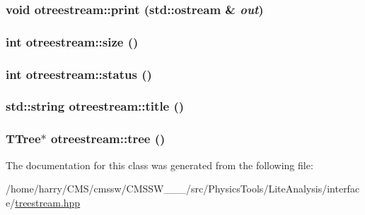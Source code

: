 \hypertarget{classotreestream_a22}{
\subsubsection[print]{\setlength{\rightskip}{0pt plus 5cm}void otreestream::print (std::ostream \& {\em out})}}
\label{classotreestream_a22}


\hypertarget{classotreestream_a18}{
\subsubsection[size]{\setlength{\rightskip}{0pt plus 5cm}int otreestream::size ()}}
\label{classotreestream_a18}


\hypertarget{classotreestream_a4}{
\subsubsection[status]{\setlength{\rightskip}{0pt plus 5cm}int otreestream::status ()}}
\label{classotreestream_a4}


\hypertarget{classotreestream_a20}{
\subsubsection[title]{\setlength{\rightskip}{0pt plus 5cm}std::string otreestream::title ()}}
\label{classotreestream_a20}


\hypertarget{classotreestream_a25}{
\subsubsection[tree]{\setlength{\rightskip}{0pt plus 5cm}TTree$\ast$ otreestream::tree ()}}
\label{classotreestream_a25}




The documentation for this class was generated from the following file:\begin{CompactItemize}
\item 
/home/harry/CMS/cmssw/CMSSW\_\_\_/src/Physics\-Tools/Lite\-Analysis/interface/\hyperlink{treestream_8hpp}{treestream.hpp}\end{CompactItemize}
